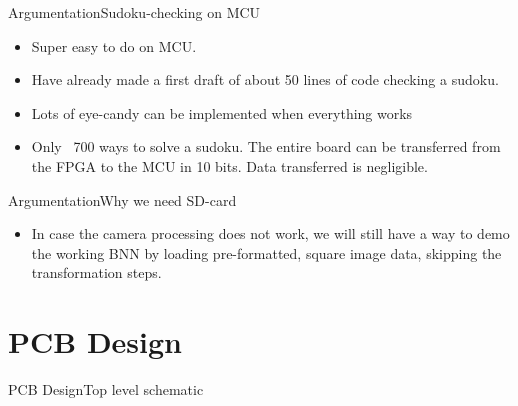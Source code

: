 \documentclass[10pt]{beamer}
\begin{document}
\begin{frame}{Argumentation}{Sudoku-checking on MCU}
\begin{itemize}
\item Super easy to do on MCU.
\item Have already made a first draft of about 50 lines of code checking a sudoku.
\item Lots of eye-candy can be implemented when everything works
\item Only ~700 ways to solve a sudoku. The entire board can be transferred from the FPGA to the MCU in 10 bits. Data transferred is negligible.
\end{itemize}
\end{frame}

\begin{frame}{Argumentation}{Why we need SD-card}
\begin{itemize}
\item In case the camera processing does not work, we will still have a way to demo the working BNN by loading pre-formatted, square image data, skipping the transformation steps.
\end{itemize}
\end{frame}

\section{PCB Design}

\begin{frame}{PCB Design}{Top level schematic}
\end{frame}
\end{document}
